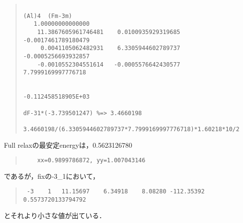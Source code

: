 \begin{quote}\begin{verbatim}

(Al)4  (Fm-3m)                          
   1.00000000000000     
    11.3867605961746481    0.0100935929319685   -0.0017461789180479
     0.0041105062482931    6.3305944602789737   -0.0005256693932857
    -0.0010552304551614   -0.0005576642430577    7.7999169997776718


-0.112458518905E+03

dF-31*(-3.739501247) %=> 3.4660198

3.4660198/(6.3305944602789737*7.7999169997776718)*1.60218*10/2
\end{verbatim}\end{quote}
Full relaxの最安定energyは，0.5623126780
\begin{quote}\begin{verbatim}
    xx=0.9899786872, yy=1.007043146
\end{verbatim}\end{quote}
であるが，fixの-3\_1において，
\begin{quote}\begin{verbatim}
 -3    1   11.15697    6.34918    8.08280 -112.35392 0.5573720133794792
\end{verbatim}\end{quote}
とそれより小さな値が出ている．

